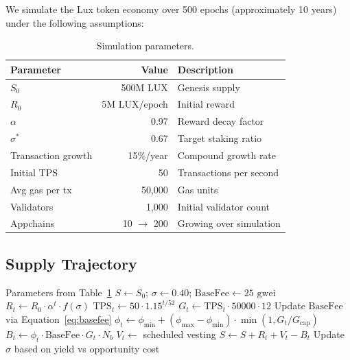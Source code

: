 \documentclass[11pt,a4paper]{article}
\begin{document}
We simulate the Lux token economy over 500 epochs (approximately 10 years) under the following assumptions:

\begin{table}[H]
\centering
\caption{Simulation parameters.}
\label{tab:simparams}
\begin{tabular}{lrl}
\toprule
\textbf{Parameter} & \textbf{Value} & \textbf{Description} \\
\midrule
$S_0$ & 500M LUX & Genesis supply \\
$R_0$ & 5M LUX/epoch & Initial reward \\
$\alpha$ & 0.97 & Reward decay factor \\
$\sigma^*$ & 0.67 & Target staking ratio \\
Transaction growth & 15\%/year & Compound growth rate \\
Initial TPS & 50 & Transactions per second \\
Avg gas per tx & 50,000 & Gas units \\
Validators & 1,000 & Initial validator count \\
Appchains & 10 $\to$ 200 & Growing over simulation \\
\bottomrule
\end{tabular}
\end{table}

\subsection{Supply Trajectory}

\begin{algorithm}[H]
\caption{Token Supply Simulation}
\label{alg:simulation}
\begin{algorithmic}[1]
\Require Parameters from Table~\ref{tab:simparams}
\State $S \gets S_0$; $\sigma \gets 0.40$; $\text{BaseFee} \gets 25 \text{ gwei}$
    \State $R_t \gets R_0 \cdot \alpha^t \cdot f(\sigma)$
    \State $\text{TPS}_t \gets 50 \cdot 1.15^{t/52}$
    \State $G_t \gets \text{TPS}_t \cdot 50000 \cdot 12$ 
    \State Update $\text{BaseFee}$ via Equation~\eqref{eq:basefee}
    \State $\phi_t \gets \phi_{\min} + (\phi_{\max} - \phi_{\min}) \cdot \min(1, G_t / G_{\text{cap}})$
    \State $B_t \gets \phi_t \cdot \text{BaseFee} \cdot G_t \cdot N_b$
    \State $V_t \gets$ scheduled vesting
    \State $S \gets S + R_t + V_t - B_t$
    \State Update $\sigma$ based on yield vs opportunity cost
\EndFor
\end{algorithmic}
\end{algorithm}
\end{document}
